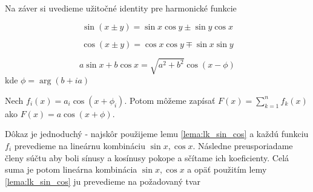 Na záver si uvedieme užitočné identity pre harmonické funkcie
\begin{lema}
    \begin{equation}
        \sin(x\pm y) = \sin x \cos y \pm \sin y \cos x
    \end{equation}
\end{lema}

\begin{lema}
    \begin{equation}
        \cos(x\pm y) = \cos x \cos y \mp \sin x \sin y
    \end{equation}
\end{lema}

\begin{lema}
    \begin{equation}
        a \sin x + b \cos x = \sqrt{a^2 + b^2} \cos (x - \phi)
    \end{equation}
    kde $\phi = \arg (b + i a)$
    \label{lema:lk_sin_cos}
\end{lema}
\begin{lema}
    Nech $f_i(x) = a_i \cos (x + \phi_i)$.
    Potom môžeme zapísať $F(x) = \sum_{k=1}^n f_k(x)$ ako
    $F(x) = a \cos (x + \phi)$.
    \label{lema:lk_harmonickych_funkcii}
\end{lema}
\begin{dokaz}
    Dôkaz je jednoduchý - najskôr použijeme lemu \ref{lema:lk_sin_cos}
    a každú funkciu $f_i$ prevedieme na lineárnu kombináciu $\sin x,
    \cos x$. Následne preusporiadame členy súčtu aby boli sínusy a
    kosínusy pokope a sčítame ich koeficienty. Celá suma je potom
    lineárna kombinácia $\sin x, \cos x$ a opäť použitím lemy
    \ref{lema:lk_sin_cos} ju prevedieme na požadovaný tvar
\end{dokaz}
